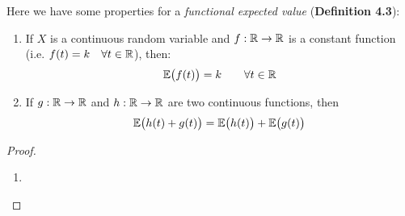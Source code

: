 \documentclass{article}
\begin{document}
	Here we have some  properties for a \emph{functional expected value} (\textbf{Definition 4.3}):
	\begin{enumerate}
		\item If $X$ is a continuous random variable and $f: \mathbb{R} \to \mathbb{R}$ is a constant function (i.e. $f(t) = k \quad \forall t \in \mathbb{R}$), then:  $$ \mathbb{E} \big( f (t) \big) = k \quad \quad \forall t \in \mathbb{R}$$
		\item If $g: \mathbb{R} \to \mathbb{R}$ and  $h: \mathbb{R} \to \mathbb{R}$ are two continuous functions, then
		$$ \mathbb{E} \big( h (t) + g (t) \big) = \mathbb{E} \big( h (t) \big) + \mathbb{E} \big( g(t) \big)$$
	\end{enumerate}
	\begin{proof}
		\begin{enumerate}
			\item
		\end{enumerate}
	\end{proof}
\end{document}

